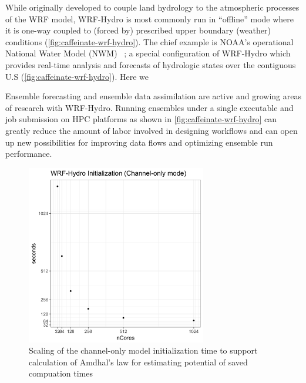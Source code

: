 While originally developed to couple land hydrology to the atmospheric processes of
the WRF model, WRF-Hydro is most commonly run in ``offline'' mode where it is one-way
coupled to (forced by) prescribed upper boundary (weather)
conditions (\ref{fig:caffeinate-wrf-hydro}). The chief example is NOAA's operational
National Water Model (NWM) ~\cite{noaa2016}; a special configuration of
WRF-Hydro which provides real-time analysis and forecasts of
hydrologic states over the contiguous U.S (\ref{fig:caffeinate-wrf-hydro}). Here we

Ensemble forecasting and ensemble data assimilation are active and
growing areas of research with WRF-Hydro. Running ensembles under a
single executable and job submission on HPC platforms as shown in
\ref{fig:caffeinate-wrf-hydro} can greatly reduce the amount
of labor involved in designing workflows and can open up new
possibilities for improving data flows and optimizing ensemble run
performance.

\begin{figure}
\includegraphics[width=0.7\textwidth]{figures/init_timing_linear.png}
\vspace{-7pt}
\caption{Scaling of the channel-only model initialization time to
  support calculation of Amdhal's law for estimating potential of
  saved compuation times \label{fig:wrf-hydro-init-scaling}}
\end{figure}

